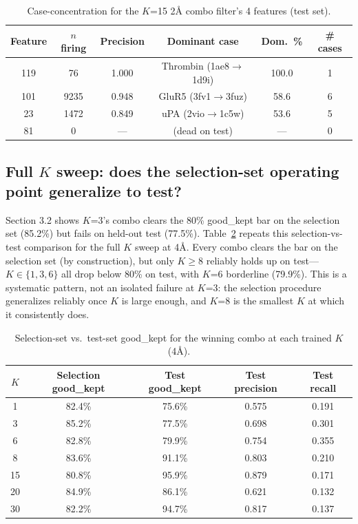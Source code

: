 \documentclass{article}
\begin{document}
\begin{table}[!ht]
\caption{\small Case-concentration for the $K$=15 2Å combo filter's 4 features (test set).}
\label{tab:k15_breakdown}
\centering
\begin{small}
\begin{tabular}{cccccc}
\toprule
Feature & $n$ firing & Precision & Dominant case & Dom.\ \% & \# cases \\
\midrule
119 & 76   & 1.000 & Thrombin (1ae8$\to$1d9i) & 100.0 & 1 \\
101 & 9235 & 0.948 & GluR5 (3fv1$\to$3fuz)    & 58.6  & 6 \\
23  & 1472 & 0.849 & uPA (2vio$\to$1c5w)      & 53.6  & 5 \\
81  & 0    & ---   & (dead on test)           & ---   & 0 \\
\bottomrule
\end{tabular}
\end{small}
\end{table}

\subsection{Full $K$ sweep: does the selection-set operating point generalize to test?}
\label{app:full-filtering}

Section 3.2 shows $K$=3's combo clears the 80\% good\_kept bar on the selection set (85.2\%) but fails on held-out test (77.5\%). Table~\ref{tab:full_filtering} repeats this selection-vs-test comparison for the full $K$ sweep at 4Å. Every combo clears the bar on the selection set (by construction), but only $K \geq 8$ reliably holds up on test---$K \in \{1, 3, 6\}$ all drop below 80\% on test, with $K$=6 borderline (79.9\%). This is a systematic pattern, not an isolated failure at $K$=3: the selection procedure generalizes reliably once $K$ is large enough, and $K$=8 is the smallest $K$ at which it consistently does.

\begin{table}[!ht]
\caption{\small Selection-set vs.\ test-set good\_kept for the winning combo at each trained $K$ (4Å).}
\label{tab:full_filtering}
\centering
\begin{small}
\begin{tabular}{ccccc}
\toprule
$K$ & Selection good\_kept & Test good\_kept & Test precision & Test recall \\
\midrule
1  & 82.4\% & 75.6\% & 0.575 & 0.191 \\
3  & 85.2\% & 77.5\% & 0.698 & 0.301 \\
6  & 82.8\% & 79.9\% & 0.754 & 0.355 \\
8  & 83.6\% & 91.1\% & 0.803 & 0.210 \\
15 & 80.8\% & 95.9\% & 0.879 & 0.171 \\
20 & 84.9\% & 86.1\% & 0.621 & 0.132 \\
30 & 82.2\% & 94.7\% & 0.817 & 0.137 \\
\bottomrule
\end{tabular}
\end{small}
\end{table}
\end{document}
